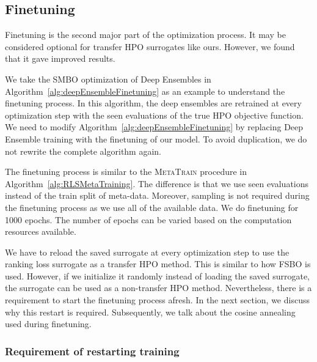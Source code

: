 \documentclass[12pt, twoside, ngerman]{report}
\begin{document}
\subsection{Finetuning}\label{sec:rlfinetune}
Finetuning is the second major part of the optimization process.
It may be considered optional for transfer HPO surrogates like ours.
However, we found that it gave improved results.

We take the SMBO optimization of Deep Ensembles in Algorithm~\ref{alg:deepEnsembleFinetuning} as an example to understand the finetuning process.
In this algorithm, the deep ensembles are retrained at every optimization step with the seen evaluations of the true HPO objective function.
We need to modify Algorithm~\ref{alg:deepEnsembleFinetuning} by replacing Deep Ensemble training with the finetuning of our model.
To avoid duplication, we do not rewrite the complete algorithm again.

The finetuning process is similar to the \textsc{MetaTrain} procedure in Algorithm~\ref{alg:RLSMetaTraining}.
The difference is that we use seen evaluations instead of the train split of meta-data. Moreover, sampling is not required during the finetuning process as we use all of the available data.
We do finetuning for 1000 epochs.
The number of epochs can be varied based on the computation resources available.

We have to reload the saved surrogate at every optimization step to use the ranking loss surrogate as a transfer HPO method. This is similar to how FSBO is used.
However, if we initialize it randomly instead of loading the saved surrogate, the surrogate can be used as a non-transfer HPO method.
Nevertheless, there is a requirement to start the finetuning process afresh. In the next section, we discuss why this restart is required.
Subsequently, we talk about the cosine annealing used during finetuning.


\subsubsection{Requirement of restarting training}\label{sec:restart}
\end{document}
